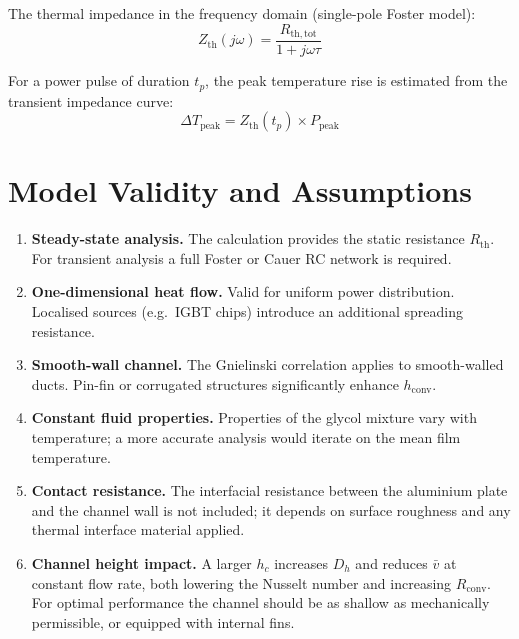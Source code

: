\documentclass[a4paper,11pt]{article}
\begin{document}
The thermal impedance in the frequency domain (single-pole Foster model):
\begin{equation}
  Z_{\mathrm{th}}(j\omega) = \frac{R_{\mathrm{th,tot}}}{1 + j\omega\tau}
\end{equation}

For a power pulse of duration $t_p$, the peak temperature rise is estimated from
the transient impedance curve:
\begin{equation}
  \Delta T_{\mathrm{peak}} = Z_{\mathrm{th}}(t_p)\times P_{\mathrm{peak}}
\end{equation}

\section{Model Validity and Assumptions}

\begin{enumerate}
  \item \textbf{Steady-state analysis.} The calculation provides the static resistance
        $R_{\mathrm{th}}$. For transient analysis a full Foster or Cauer RC network is required.

  \item \textbf{One-dimensional heat flow.} Valid for uniform power distribution.
        Localised sources (e.g.\ IGBT chips) introduce an additional spreading
        resistance.

  \item \textbf{Smooth-wall channel.} The Gnielinski correlation applies to smooth-walled
        ducts. Pin-fin or corrugated structures significantly enhance $h_{\mathrm{conv}}$.

  \item \textbf{Constant fluid properties.} Properties of the glycol mixture vary with
        temperature; a more accurate analysis would iterate on the mean film temperature.

  \item \textbf{Contact resistance.} The interfacial resistance between the aluminium
        plate and the channel wall is not included; it depends on surface roughness and
        any thermal interface material applied.

  \item \textbf{Channel height impact.} A larger $h_c$ increases $D_h$ and reduces
        $\bar{v}$ at constant flow rate, both lowering the Nusselt number and
        increasing $R_{\mathrm{conv}}$. For optimal performance the channel should be
        as shallow as mechanically permissible, or equipped with internal fins.
\end{enumerate}
\end{document}
